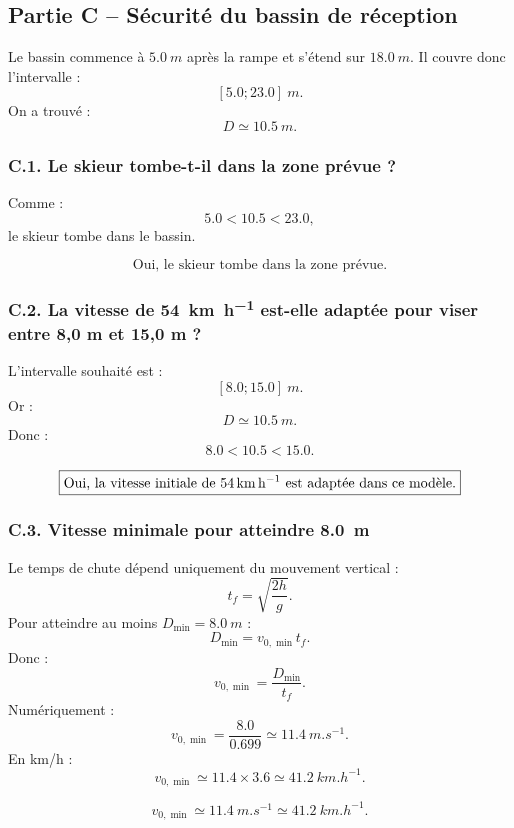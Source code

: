 \documentclass[11pt,a4paper]{article}
\begin{document}
\subsection{Partie C -- Sécurité du bassin de réception}

Le bassin commence à $\SI{5.0}{m}$ après la rampe et s'étend sur $\SI{18.0}{m}$.
Il couvre donc l'intervalle :
\[
[5.0;23.0]\ \si{m}.
\]
On a trouvé :
\[
D\simeq \SI{10.5}{m}.
\]

\subsubsection*{C.1. Le skieur tombe-t-il dans la zone prévue ?}

Comme :
\[
5.0 < 10.5 < 23.0,
\]
le skieur tombe dans le bassin.

\begin{resultatbox}
\[
\boxed{\text{Oui, le skieur tombe dans la zone prévue.}}
\]
\end{resultatbox}

\subsubsection*{C.2. La vitesse de \SI{54}{km.h^{-1}} est-elle adaptée pour viser entre 8,0 m et 15,0 m ?}

L'intervalle souhaité est :
\[
[8.0;15.0]\ \si{m}.
\]
Or :
\[
D\simeq \SI{10.5}{m}.
\]
Donc :
\[
8.0<10.5<15.0.
\]

\begin{resultatbox}
\[
\boxed{\text{Oui, la vitesse initiale de \SI{54}{km.h^{-1}} est adaptée dans ce modèle.}}
\]
\end{resultatbox}

\subsubsection*{C.3. Vitesse minimale pour atteindre \SI{8.0}{m}}

Le temps de chute dépend uniquement du mouvement vertical :
\[
t_f=\sqrt{\frac{2h}{g}}.
\]
Pour atteindre au moins $D_{\min}=\SI{8.0}{m}$ :
\[
D_{\min}=v_{0,\min}t_f.
\]
Donc :
\[
v_{0,\min}=\frac{D_{\min}}{t_f}.
\]
Numériquement :
\[
v_{0,\min}=\frac{8.0}{0.699}\simeq 11.4\ \si{m.s^{-1}}.
\]
En km/h :
\[
v_{0,\min}\simeq 11.4\times 3.6\simeq 41.2\ \si{km.h^{-1}}.
\]

\begin{resultatbox}
\[
\boxed{v_{0,\min}\simeq \SI{11.4}{m.s^{-1}}\simeq \SI{41.2}{km.h^{-1}}.}
\]
\end{resultatbox}
\end{document}
